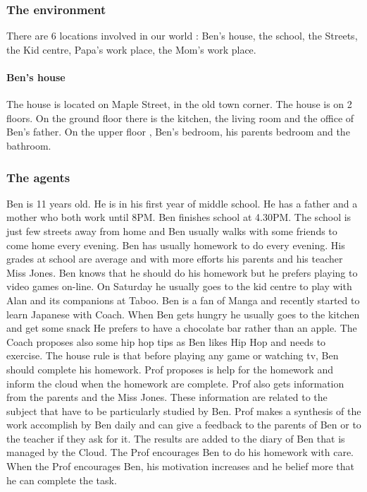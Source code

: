 \subsubsection{The environment}
There are 6 locations involved in our world : Ben's house, the school, the Streets, the Kid centre, Papa's work place, the Mom's work place. 
\paragraph{Ben's house}
The house is located on Maple Street, in the old town corner.
The house is on 2 floors. 
On the ground floor there is the kitchen, the living room and the office of Ben's father.
On the upper floor , Ben's bedroom, his parents bedroom and the bathroom. 


\subsubsection{The agents}
Ben is 11 years old. He is in his first year of middle school. He has a father and a mother who both work until 8PM. Ben finishes school at 4.30PM. The school is just few streets away from home and Ben usually walks with some friends to come home every evening. 
Ben has usually homework to do every evening. His grades at school are average and with more efforts his parents and his teacher Miss Jones. Ben knows that he should do his homework but he prefers playing to video games on-line. On Saturday he usually goes to the kid centre to play with Alan and its companions at Taboo. 
Ben is a fan of Manga and recently started to learn Japanese with Coach.
When Ben gets hungry he usually goes to the kitchen and get some snack He prefers to have a chocolate bar rather than an apple.
The Coach proposes also some hip hop tips as Ben likes Hip Hop and needs to exercise. 
The house rule is that before playing any game or watching tv, Ben should complete his homework. 
Prof proposes is help for the homework and inform the cloud when the homework are complete. 
Prof also gets information from the parents and the Miss Jones. These information are related to the subject that have to be particularly studied by Ben. Prof makes a synthesis of the work accomplish by Ben daily and can give a feedback to the parents of Ben or to the teacher if they ask for it. 
The results are added to the diary of Ben that is managed by the Cloud. 
The Prof encourages Ben to do his homework with care.
When the Prof encourages Ben, his motivation increases and he belief more that he can complete the task. 

